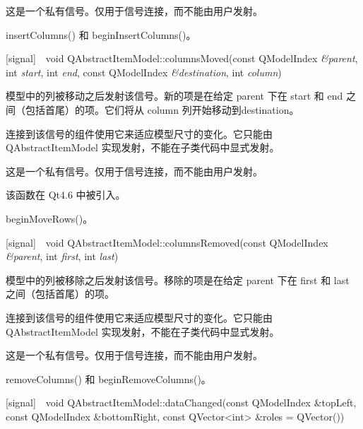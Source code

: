 \begin{notice}
这是一个私有信号。仅用于信号连接，而不能由用户发射。
\end{notice}
  
\begin{seeAlso}
insertColumns() 和 beginInsertColumns()。
\end{seeAlso}

[signal] void QAbstractItemModel::columnsMoved(const QModelIndex \emph{\&parent}, int \emph{start}, int \emph{end}, const QModelIndex \emph{\&destination}, int \emph{column})

模型中的列被移动之后发射该信号。新的项是在给定 parent 下在 start 和 end 之间（包括首尾）的项。它们将从 column 列开始移动到destination。

\begin{notice}
连接到该信号的组件使用它来适应模型尺寸的变化。它只能由 QAbstractItemModel 实现发射，不能在子类代码中显式发射。
\end{notice}

\begin{notice}
这是一个私有信号。仅用于信号连接，而不能由用户发射。
\end{notice}

该函数在 Qt4.6 中被引入。

\begin{seeAlso}
beginMoveRows()。
\end{seeAlso}

[signal] void QAbstractItemModel::columnsRemoved(const QModelIndex \emph{\&parent}, int \emph{first}, int \emph{last})

模型中的列被移除之后发射该信号。移除的项是在给定 parent 下在 first 和 last 之间（包括首尾）的项。


\begin{notice}
连接到该信号的组件使用它来适应模型尺寸的变化。它只能由 QAbstractItemModel 实现发射，不能在子类代码中显式发射。
\end{notice}

\begin{notice}
这是一个私有信号。仅用于信号连接，而不能由用户发射。
\end{notice}

\begin{seeAlso}
removeColumns() 和 beginRemoveColumns()。
\end{seeAlso}

[signal] void QAbstractItemModel::dataChanged(const QModelIndex \&topLeft, const QModelIndex \&bottomRight, const QVector<int> \&roles = QVector())

